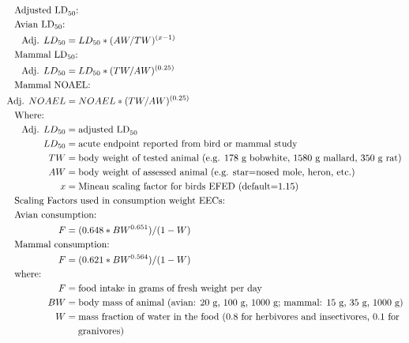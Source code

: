 \documentclass[10pt]{article}
\begin{document}
\begin{align*}
& \hspace{-0.75in}  \text{Adjusted LD}_{50}\text{:} \nonumber \\
& \hspace{-0.75in}  \text{Avian LD}_{50}\text{:} \nonumber \\
\text{Adj. } LD_{50} & = LD_{50}*(AW / TW)^{(x-1)} \nonumber \\
& \hspace{-0.75in}  \text{Mammal LD}_{50}\text{:} \nonumber \\
\text{Adj. } LD_{50} & = LD_{50}*(TW / AW)^{(0.25)}\\
& \hspace{-0.75in}  \text{Mammal NOAEL:}\nonumber \\
\text{Adj. } NOAEL & = NOAEL*(TW / AW)^{(0.25)}\\
& \hspace{-0.75in}  \text{Where:} \nonumber \\
\text{Adj. }LD_{50} & = \text{adjusted LD}_{50}\\
LD_{50} & = \text{acute endpoint reported from bird or mammal study}\\ 
TW & = \text{body weight of tested animal (e.g. 178 g bobwhite, 1580 g mallard, 350 g rat)}\\
AW & = \text{body weight of assessed animal (e.g. star=nosed mole, heron, etc.)}\\
x & = \text{Mineau scaling factor for birds EFED (default=1.15)}\\
& \hspace{-0.75in}  \text{Scaling Factors used in consumption weight EECs:} \nonumber \\
& \hspace{-0.75in}  \text{Avian consumption:} \nonumber \\
F & = (0.648 * BW^{0.651}) / (1 - W )\\
& \hspace{-0.75in}  \text{Mammal consumption:} \nonumber \\
F & = (0.621 * BW^{0.564}) / (1 - W )\\ 
& \hspace{-0.75in}  \text{where:} \nonumber \\
F & = \text{food intake in grams of fresh weight per day}\\
BW & = \text{body mass of animal (avian: 20 g, 100 g, 1000 g; mammal: 15 g, 35 g, 1000 g)}\\
W & = \text{mass fraction of water in the food (0.8 for herbivores and insectivores, 0.1 for}\\ &\hspace{1.3em}\text{granivores)}\nonumber \\

\end{align*}
\end{document}
